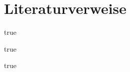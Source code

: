 \documentclass[a4paper,fleqn,german]{book}
\begin{document}
\chapter{Literaturverweise}%
%





\anhangstuff %
{true} %
{
%
}




\literaturverzeichnis%
{true} %



\bezeichnungenChapter%
{true} %
{}


%
%
%
%
%

\listoftodos%

\end{document}

